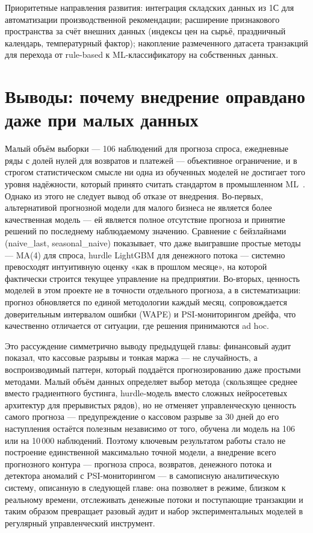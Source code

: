 Приоритетные направления развития: интеграция складских данных из 1С для автоматизации производственной рекомендации; расширение признакового пространства за счёт внешних данных (индексы цен на сырьё, праздничный календарь, температурный фактор); накопление размеченного датасета транзакций для перехода от rule-based к ML-классификатору на собственных данных.

\section{Выводы: почему внедрение оправдано даже при малых данных}

Малый объём выборки --- 106 наблюдений для прогноза спроса, ежедневные ряды с долей нулей для возвратов и платежей --- объективное ограничение, и в строгом статистическом смысле ни одна из обученных моделей не достигает того уровня надёжности, который принято считать стандартом в промышленном ML~\cite{makridakis2018m4}. Однако из этого не следует вывод об отказе от внедрения. Во-первых, альтернативой прогнозной модели для малого бизнеса не является более качественная модель --- ей является полное отсутствие прогноза и принятие решений по последнему наблюдаемому значению. Сравнение с бейзлайнами (naive\_last, seasonal\_naive) показывает, что даже выигравшие простые методы --- MA(4) для спроса, hurdle LightGBM для денежного потока --- системно превосходят интуитивную оценку «как в прошлом месяце», на которой фактически строится текущее управление на предприятии. Во-вторых, ценность моделей в этом проекте не в точности отдельного прогноза, а в систематизации: прогноз обновляется по единой методологии каждый месяц, сопровождается доверительным интервалом ошибки (WAPE) и PSI-мониторингом дрейфа, что качественно отличается от ситуации, где решения принимаются ad hoc.

Это рассуждение симметрично выводу предыдущей главы: финансовый аудит показал, что кассовые разрывы и тонкая маржа --- не случайность, а воспроизводимый паттерн, который поддаётся прогнозированию даже простыми методами. Малый объём данных определяет выбор метода (скользящее среднее вместо градиентного бустинга, hurdle-модель вместо сложных нейросетевых архитектур для прерывистых рядов), но не отменяет управленческую ценность самого прогноза --- предупреждение о кассовом разрыве за 30 дней до его наступления остаётся полезным независимо от того, обучена ли модель на 106 или на 10\,000 наблюдений. Поэтому ключевым результатом работы стало не построение единственной максимально точной модели, а внедрение всего прогнозного контура --- прогноза спроса, возвратов, денежного потока и детектора аномалий с PSI-мониторингом --- в самописную аналитическую систему, описанную в следующей главе: она позволяет в режиме, близком к реальному времени, отслеживать денежные потоки и поступающие транзакции и таким образом превращает разовый аудит и набор экспериментальных моделей в регулярный управленческий инструмент.
